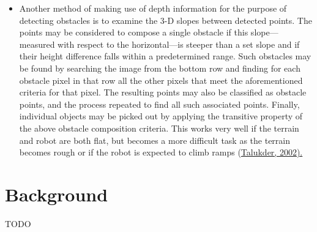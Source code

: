\documentclass[12pt]{report}
\begin{document}
\begin{itemize}
\item{Another method of making use of depth information for the purpose of detecting obstacles is to examine the 3-D slopes between detected points.  The points may be considered to compose a single obstacle if this slope---measured with respect to the horizontal---is steeper than a set slope and if their height difference falls within a predetermined range.  Such obstacles may be found by searching the image from the bottom row and finding for each obstacle pixel in that row all the other pixels that meet the aforementioned criteria for that pixel.  The resulting points may also be classified as obstacle points, and the process repeated to find all such associated points.  Finally, individual objects may be picked out by applying the transitive property of the above obstacle composition criteria.  This works very well if the terrain and robot are both flat, but becomes a more difficult task as the terrain becomes rough or if the robot is expected to climb ramps (\hyperref[bib:talukder]{Talukder, 2002).}}
\end{itemize}

\section{Background}
TODO
\end{document}
